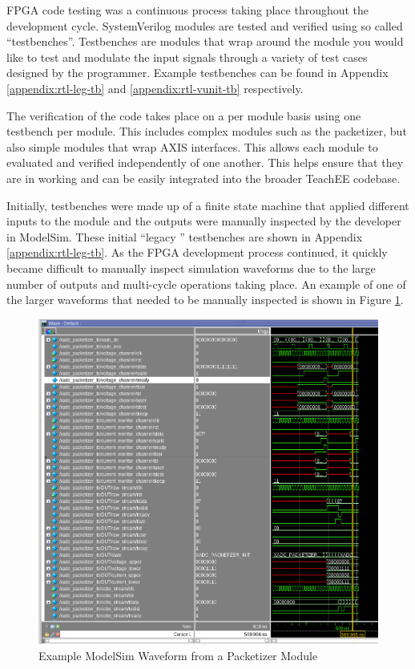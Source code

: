 \documentclass[letterpaper,11pt]{article}
\begin{document}
FPGA code testing was a continuous process taking place throughout the
development cycle. SystemVerilog modules are tested and verified using so called
``testbenches''. Testbenches are modules that wrap around the module you would
like to test and modulate the input signals through a variety of test cases
designed by the programmer. Example testbenches can be found in Appendix
\ref{appendix:rtl-leg-tb} and \ref{appendix:rtl-vunit-tb} respectively.

The verification of the code takes place on a per module basis using one
testbench per module. This includes complex modules such as the packetizer, but
also simple modules that wrap AXIS interfaces. This allows each module to
evaluated and verified independently of one another. This helps ensure that they
are in working and can be easily integrated into the broader TeachEE codebase.

Initially, testbenches were made up of a finite state machine that applied
different inputs to the module and the outputs were manually inspected by the
developer in ModelSim. These initial ``legacy '' testbenches are shown in
Appendix \ref{appendix:rtl-leg-tb}. As the FPGA development process continued,
it quickly became difficult to manually inspect simulation waveforms due to the
large number of outputs and multi-cycle operations taking place. An example of
one of the larger waveforms that needed to be manually inspected is shown in
Figure \ref{fig:xadc-packetizer-modelsim}.

\begin{figure}[H]
  \centering
  \includegraphics[width=\textwidth]{figures/modelsim-packetizer.png}
  \caption{Example ModelSim Waveform from a Packetizer Module}
  \label{fig:xadc-packetizer-modelsim}
\end{figure}
\end{document}
